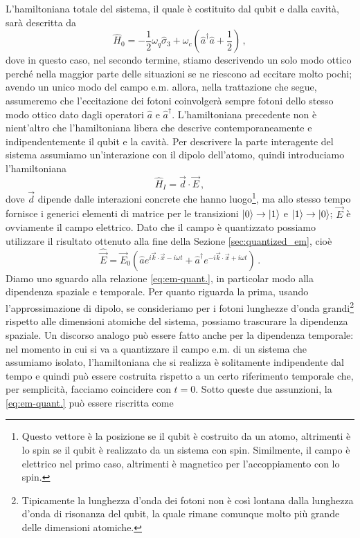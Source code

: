 \noindent L'hamiltoniana totale del sistema, il quale è costituito dal qubit e dalla cavità, sarà descritta da
\begin{equation}\label{eq:ham-cav-qub-free}
    \hat H_0 = -\frac 12 \omega_q\hat \sigma_3+\omega_c\left(\hat a^\dagger \hat a +\frac 12\right) \, ,
\end{equation}
dove in questo caso, nel secondo termine, stiamo descrivendo un solo modo ottico perché nella maggior parte delle situazioni se ne riescono ad eccitare molto pochi; avendo un unico modo del campo e.m. allora, nella trattazione che segue, assumeremo che l'eccitazione dei fotoni coinvolgerà sempre fotoni dello stesso modo ottico dato dagli operatori $\hat{a}$ e $\hat{a}^\dag$. L'hamiltoniana precedente non è nient'altro che l'hamiltoniana libera che descrive contemporaneamente e indipendentemente il qubit e la cavità. Per descrivere la parte interagente del sistema assumiamo un'interazione con il dipolo dell'atomo, quindi introduciamo l'hamiltoniana
\begin{equation}\label{eq:ham-cav-qub-int}
    \hat H_I=\vec d \cdot \vec E \, ,
\end{equation}
dove $\vec d$ dipende dalle interazioni concrete che hanno luogo\footnote{Questo vettore è la posizione se il qubit è costruito da un atomo, altrimenti è lo spin se il qubit è realizzato da un sistema con spin. Similmente, il campo è elettrico nel primo caso, altrimenti è magnetico per l'accoppiamento con lo spin.}, ma allo stesso tempo fornisce i generici elementi di matrice per le transizioni $\ket 0 \rightarrow \ket 1$ e $\ket 1 \rightarrow \ket 0$; $\vec E$ è ovviamente il campo elettrico. Dato che il campo è quantizzato possiamo utilizzare il risultato ottenuto alla fine della Sezione \ref{sec:quantized_em}, cioè
\begin{equation}\label{eq:em-quant.}
    \hat{\vec E} = \vec E_0\left(\hat a e^{i\vec k \cdot \vec x - i \omega t} + \hat a^\dagger e^{-i\vec k \cdot \vec x + i \omega t}\right) \, .
\end{equation}
Diamo uno sguardo alla relazione \eqref{eq:em-quant.}, in particolar modo alla dipendenza spaziale e temporale. Per quanto riguarda la prima, usando l'approssimazione di dipolo, se consideriamo per i fotoni lunghezze d'onda grandi\footnote{Tipicamente la lunghezza d'onda dei fotoni non è così lontana dalla lunghezza d'onda di risonanza del qubit, la quale rimane comunque molto più grande delle dimensioni atomiche.} rispetto alle dimensioni atomiche del sistema, possiamo trascurare la dipendenza spaziale. Un discorso analogo può essere fatto anche per la dipendenza temporale: nel momento in cui si va a quantizzare il campo e.m. di un sistema che assumiamo isolato, l'hamiltoniana che si realizza è solitamente indipendente dal tempo e quindi può essere costruita rispetto a un certo riferimento temporale che, per semplicità, facciamo coincidere con $t=0$. Sotto queste due assunzioni, la \eqref{eq:em-quant.} può essere riscritta come
